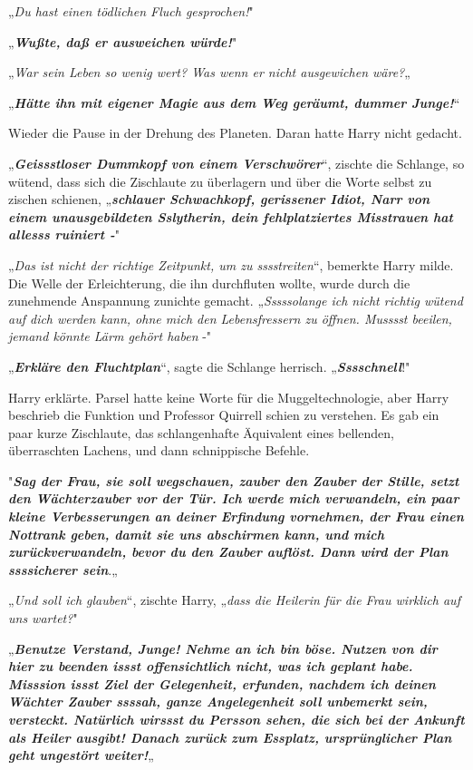 {„\emph{Du hast einen tödlichen Fluch gesprochen!}"

„\textbf{\emph{Wußte, daß er ausweichen würde!}}"

„\emph{War sein Leben so wenig wert? Was wenn er nicht ausgewichen wäre?}„

„\textbf{\emph{Hätte ihn mit eigener Magie aus dem Weg geräumt, dummer Junge!}}“

Wieder die Pause in der Drehung des Planeten. Daran hatte Harry nicht gedacht.

„\textbf{\emph{Geissstloser Dummkopf von einem Verschwörer}}“, zischte die Schlange, so wütend, dass sich die Zischlaute zu überlagern und über die Worte selbst zu zischen schienen, „\textbf{\emph{schlauer Schwachkopf, gerissener Idiot, Narr von einem unausgebildeten Sslytherin, dein fehlplatziertes Misstrauen hat allesss ruiniert -}}"

„\emph{Das ist nicht der richtige Zeitpunkt, um zu sssstreiten}“, bemerkte Harry milde.\\ Die Welle der Erleichterung, die ihn durchfluten wollte, wurde durch die zunehmende Anspannung zunichte gemacht. „\emph{Sssssolange ich nicht richtig wütend auf dich werden kann, ohne mich den Lebensfressern zu öffnen. Musssst beeilen, jemand könnte Lärm gehört haben} -"

„\textbf{\emph{Erkläre den Fluchtplan}}“, sagte die Schlange herrisch. „\textbf{\emph{Sssschnell}}!"

Harry erklärte. Parsel hatte keine Worte für die Muggeltechnologie, aber Harry beschrieb die Funktion und Professor Quirrell schien zu verstehen. Es gab ein paar kurze Zischlaute, das schlangenhafte Äquivalent eines bellenden, überraschten Lachens, und dann schnippische Befehle.

"\textbf{\emph{Sag der Frau, sie soll wegschauen, zauber den Zauber der Stille, setzt den Wächterzauber vor der Tür. Ich werde mich verwandeln, ein paar kleine Verbesserungen an deiner Erfindung vornehmen, der Frau einen Nottrank geben, damit sie uns abschirmen kann, und mich zurückverwandeln, bevor du den Zauber auflöst. Dann wird der Plan ssssicherer sein}}.„

„\emph{Und soll ich glauben}“, zischte Harry, „\emph{dass die Heilerin für die Frau wirklich auf uns wartet?}"

„\textbf{\emph{Benutze Verstand, Junge! Nehme an ich bin böse. Nutzen von dir}}\\ \textbf{\emph{hier zu beenden issst offensichtlich nicht, was ich geplant habe.\\ Misssion issst Ziel der Gelegenheit, erfunden, nachdem ich deinen Wächter Zauber ssssah, ganze Angelegenheit soll unbemerkt sein, versteckt. Natürlich wirssst du Persson sehen, die sich bei der Ankunft als Heiler ausgibt! Danach zurück zum Essplatz, ursprünglicher Plan geht ungestört weiter!}}„

}
